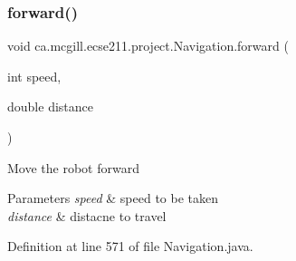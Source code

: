 \subsubsection{\texorpdfstring{forward()}{forward()}}
{\footnotesize\ttfamily void ca.\+mcgill.\+ecse211.\+project.\+Navigation.\+forward (\begin{DoxyParamCaption}\item[{int}]{speed,  }\item[{double}]{distance }\end{DoxyParamCaption})}

Move the robot forward


\begin{DoxyParams}{Parameters}
{\em speed} & speed to be taken \\
\hline
{\em distance} & distacne to travel \\
\hline
\end{DoxyParams}


Definition at line 571 of file Navigation.\+java.


